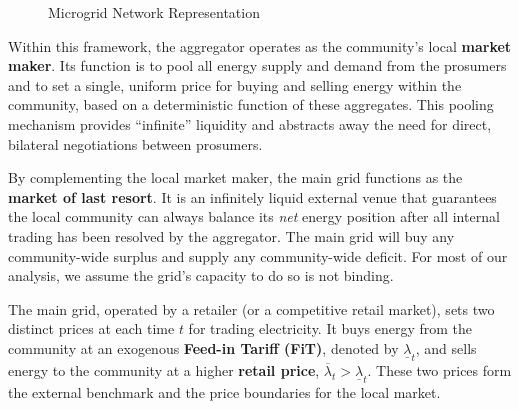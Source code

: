 \documentclass[12pt, notitlepage]{article}
\begin{document}
\begin{figure}
    \centering
{}
    \caption{Microgrid Network Representation}
    \label{fig:placeholder}
\end{figure}


Within this framework, the aggregator operates as the community's local \textbf{market maker}. Its function is to pool all energy supply and demand from the prosumers and to set a single, uniform price for buying and selling energy within the community, based on a deterministic function of these aggregates. This pooling mechanism provides ``infinite''  liquidity and abstracts away the need for direct, bilateral negotiations between prosumers.

By complementing the local market maker, the main grid functions as the \textbf{market of last resort}. It is an infinitely liquid external venue that guarantees the local community can always balance its \textit{net} energy position after all internal trading has been resolved by the aggregator. The main grid will buy any community-wide surplus and supply any community-wide deficit. For most of our analysis, we assume the grid's capacity to do so is not binding.

The main grid, operated by a retailer (or a competitive retail market), sets two distinct prices at each time $t$ for trading electricity. It buys energy from the community at an exogenous \textbf{Feed-in Tariff (FiT)}, denoted by $\underline{\lambda}_t$, and sells energy to the community at a higher \textbf{retail price}, $\overline{\lambda}_t > \underline{\lambda}_t$. These two prices form the external benchmark and the price boundaries for the local market.
\end{document}
